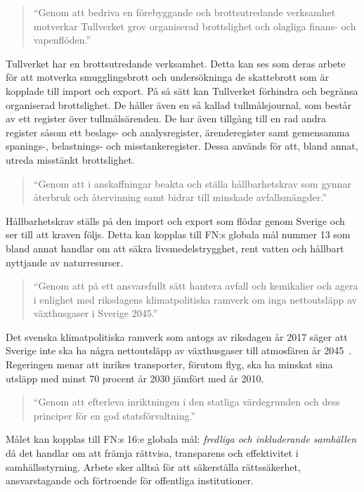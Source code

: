 \begin{quotation}
    ``Genom att bedriva en förebyggande och brottsutredande verksamhet
    motverkar Tullverket grov organiserad brottslighet och olagliga finans-
    och vapenflöden.''
\end{quotation}

Tullverket har en brottsutredande verksamhet. Detta kan ses som deras arbete
för att motverka smugglingsbrott och undersökninga de skattebrott som är
kopplade till import och export. På så sätt kan Tullverket förhindra och
begränsa organiserad brottslighet.
%
De håller även en så kallad tullmålsjournal, som består av ett register över
tullmålsärenden. De har även tillgång till en rad andra register såsom ett
beslags- och analysregister, ärenderegister samt gemensamma spanings-,
belastnings- och misstankeregister. Dessa används för att, bland annat,
utreda misstänkt brottslighet.

\begin{quotation}
    ``Genom att i anskaffningar beakta och ställa hållbarhetskrav som gynnar
    återbruk och återvinning samt bidrar till minskade avfallsmängder.''
\end{quotation}

Hållbarhetskrav ställs på den import och export som flödar genom Sverige och
ser till att kraven följs. Detta kan kopplas till FN:s globala mål nummer 13 som bland annat handlar om att säkra livsmedelstrygghet, rent vatten och hållbart nyttjande av naturresurser.

\begin{quotation}
    ``Genom att på ett ansvarsfullt sätt hantera avfall och kemikalier och
    agera i enlighet med riksdagens klimatpolitiska ramverk om inga
    nettoutsläpp av växthusgaser i Sverige 2045.''
\end{quotation}

Det svenska klimatpolitiska ramverk som antogs av riksdagen år 2017 säger att
Sverige inte ska ha några nettoutsläpp av växthusgaser till atmosfären år
2045~\cite{ramverk}.
Regeringen menar att inrikes transporter, förutom flyg, ska ha minskat sina
utsläpp med minst 70 procent år 2030 jämfört med år 2010.

\begin{quotation}
    ``Genom att efterleva inriktningen i den statliga värdegrunden och dess
    principer för en god statsförvaltning.''
\end{quotation}

Målet kan kopplas till FN:s 16:e globala mål: \emph{fredliga och inkluderande
samhällen} då det handlar om att främja rättvisa, transparens och effektivitet
i samhällsstyrning. Arbete sker alltså för att säkerställa rättssäkerhet,
ansvarstagande och förtroende för offentliga institutioner.

